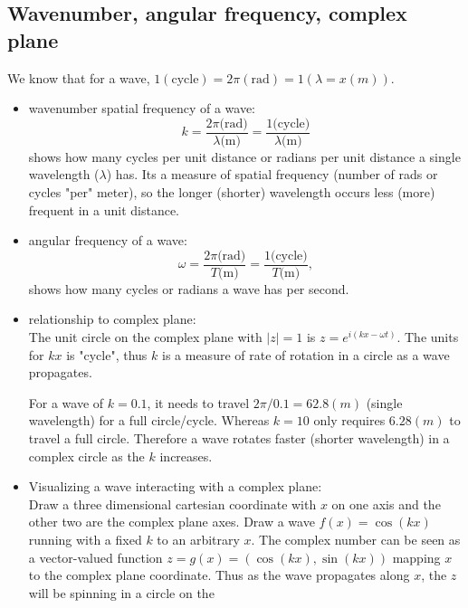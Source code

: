 \setlength\parindent{0pt} 

\subsection{Wavenumber, angular frequency, complex plane} We know that for
a wave, $1 (\text{cycle}) = 2\pi (\text{rad}) = 1 (\lambda = x (m))$.  \begin{itemize} \item
wavenumber spatial frequency of a wave: \\ \begin{equation} k  = \frac{2 \pi \text{(rad)}}{\lambda
\text{(m)}} = \frac{1 \text{(cycle)}}{\lambda \text{(m)}} \end{equation} shows how many cycles per
unit distance or radians per unit distance a single wavelength ($\lambda$) has.  Its a measure of
spatial frequency (number of rads or cycles "per" meter), so the longer (shorter) wavelength occurs
less (more) frequent in a unit distance.  \item angular frequency of a wave: \\ \begin{equation}
\omega  = \frac{2 \pi \text{(rad)}}{T \text{(m)}} = \frac{1 \text{(cycle)}}{T \text{(m)}},
\end{equation} shows how many cycles or radians a wave has per second.  \item relationship to
complex plane: \\ The unit circle on the complex plane with $|z|=1$ is $z = e^{i(kx-\omega t)}$.
The units for $kx$ is "cycle", thus $k$ is a measure of rate of rotation in a circle as a wave
propagates.  \begin{exmp} For a wave of $k=0.1$, it needs to travel $2\pi/0.1= 62.8(m)$ (single
wavelength) for a full circle/cycle.  Whereas $k=10$ only requires $6.28(m)$ to travel a full
circle.  Therefore a wave rotates faster (shorter wavelength) in a complex circle as the $k$
increases.  \end{exmp} \item Visualizing a wave interacting with a complex plane: \\ Draw a three
dimensional cartesian coordinate with $x$ on one axis and the other two are the complex plane axes.
Draw a wave $f(x)=\cos(kx)$ running with a fixed $k$ to an arbitrary $x$.  The complex number can be
seen as a vector-valued function $z=g(x)=(\cos(kx),\sin(kx))$ mapping $x$ to the complex plane
coordinate.  Thus as the wave propagates along $x$, the $z$ will be spinning in a circle on the

\end{itemize}
